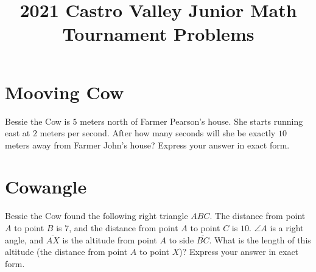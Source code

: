 \documentclass{article}
\title{2021 Castro Valley Junior Math Tournament Problems}
\author{}
\date{}
\begin{document}
\maketitle

\section*{Mooving Cow}
Bessie the Cow is $5$ meters north of Farmer Pearson's house.
She starts running east at $2$ meters per second.
After how many seconds will she be exactly $10$ meters away from Farmer John's house?
Express your answer in exact form.

\section*{Cowangle}
\begin{figure}
	\vspace{-20pt}
	\centering
	\vspace{-20pt}
\end{figure}
Bessie the Cow found the following right triangle $ABC$.
The distance from point $A$ to point $B$ is $7$, and the distance from point $A$ to point $C$ is $10$.
$\angle A$ is a right angle, and $\overline{AX}$ is the altitude from point $A$ to side $\overline{BC}$.
What is the length of this altitude (the distance from point $A$ to point $X$)?
Express your answer in exact form.
\end{document}
